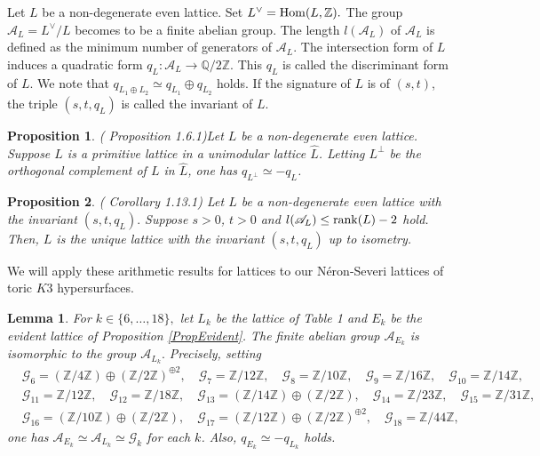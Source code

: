 \documentclass[10pt]{article}
\newtheorem{lem}{Lemma}[section]
\newtheorem{prop}{Proposition}[section]
\begin{document}
Let $L$ be a non-degenerate even lattice.
Set $L^\vee ={\rm Hom}(L,\mathbb{Z}).$
The group $\mathscr{A}_L = L^\vee /L$ becomes to be a finite abelian group.
The length $l(\mathscr{A}_L)$ of $\mathscr{A}_L$ is defined as the minimum number of generators of $\mathscr{A}_L.$
The intersection form of $L$
induces a quadratic form $q_L:\mathscr{A}_L \rightarrow \mathbb{Q}/2\mathbb{Z}.$
This $q_L$ is called the discriminant form of $L$.
We note that $q_{L_1 \oplus L_2} \simeq q_{L_1} \oplus q_{L_2}$ holds.
If the signature of $L$ is of $(s,t)$,
the triple $(s,t,q_L)$ is called the invariant of $L$.


\begin{prop} (\cite{Ni} Proposition 1.6.1)\label{PropLatticeOrthogonal}
Let $L$ be a non-degenerate even lattice.
Suppose $L$ is a primitive lattice in a unimodular lattice $\widehat{L}$.
Letting $L^\perp$ be the orthogonal complement of $L$ in $\widehat{L}$,
one has $q_{L^\perp} \simeq -q_{L}$.
 \end{prop}


\begin{prop} (\cite{Ni} Corollary 1.13.1) \label{PropQI}
Let $L$ be a non-degenerate even lattice with the invariant $(s,t,q_L).$
Suppose $s>0$, $t>0$ and $l(\mathscr{A}_L)\leq {\rm rank}(L)-2$ hold.
Then, $L$ is the unique lattice with the invariant $(s,t,q_L)$ up to isometry.
\end{prop}



We will apply these arithmetic  results for lattices to our N\'eron-Severi lattices of toric $K3$ hypersurfaces.


\begin{lem}\label{LemFinAbel}
For $k\in\{6,\ldots, 18\},$ let $L_k$ be the lattice of Table 1 and $E_k$ be the evident lattice of Proposition \ref{PropEvident}.
The finite abelian group $\mathscr{A}_{E_k}$ is isomorphic to the group $\mathscr{A}_{L_k}.$ 
Precisely,  setting  
\begin{align*}
& 
\mathcal{G}_6=(\mathbb{Z}/4\mathbb{Z})\oplus (\mathbb{Z}/2\mathbb{Z})^{ \oplus 2} ,\quad 
\mathcal{G}_7=\mathbb{Z}/12 \mathbb{Z}, \quad
\mathcal{G}_8 = \mathbb{Z}/10 \mathbb{Z}, \quad 
\mathcal{G}_9 =\mathbb{Z}/16 \mathbb{Z}, \quad
\mathcal{G}_{10}=\mathbb{Z}/14 \mathbb{Z},
\\
&
\mathcal{G}_{11}=\mathbb{Z}/12 \mathbb{Z}, \quad
\mathcal{G}_{12}=\mathbb{Z}/18 \mathbb{Z}, \quad
\mathcal{G}_{13}=(\mathbb{Z}/14 \mathbb{Z})\oplus (\mathbb{Z}/2 \mathbb{Z}), \quad
\mathcal{G}_{14}=\mathbb{Z}/23 \mathbb{Z},\quad
\mathcal{G}_{15}=\mathbb{Z}/31 \mathbb{Z},\\
&
\mathcal{G}_{16}=(\mathbb{Z}/10\mathbb{Z})\oplus (\mathbb{Z}/2 \mathbb{Z}),\quad
\mathcal{G}_{17}=(\mathbb{Z}/12 \mathbb{Z}) \oplus (\mathbb{Z}/2 \mathbb{Z})^{\oplus 2}, \quad
\mathcal{G}_{18}=\mathbb{Z}/44 \mathbb{Z},
\end{align*}
one has $\mathscr{A}_{E_k} \simeq \mathscr{A}_{L_k} \simeq \mathcal{G}_k$ for each $k$.
Also,  $q_{E_k} \simeq - q_{L_k}$ holds.
\end{lem}
\end{document}
